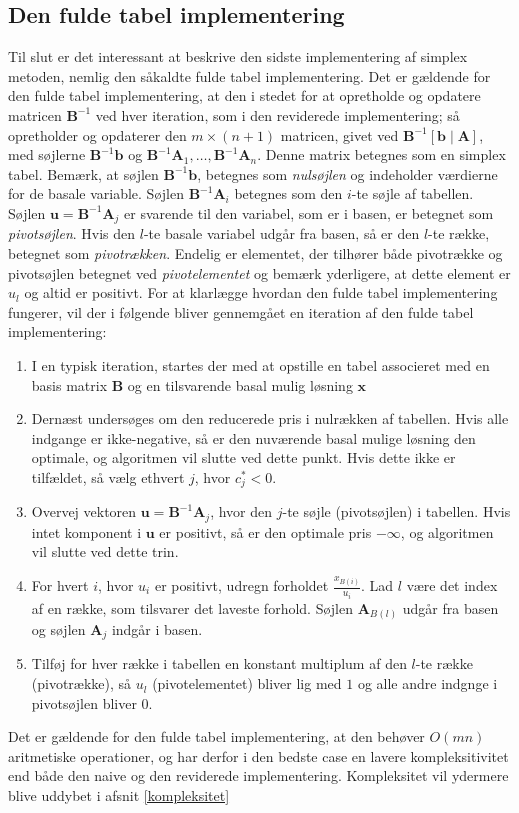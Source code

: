 \subsection{Den fulde tabel implementering}
Til slut er det interessant at beskrive den sidste implementering af simplex metoden, nemlig den såkaldte fulde tabel implementering. Det er gældende for den fulde tabel implementering, at den i stedet for at opretholde og opdatere matricen $\mathbf{B}^{-1}$ ved hver iteration, som i den reviderede implementering; så opretholder og opdaterer den $m \times (n+1)$ matricen, givet ved $\mathbf{B}^{-1} \left [ \mathbf{b} \mid \mathbf{A} \right ]$, med søjlerne $\mathbf{B}^{-1}\mathbf{b}$ og $\mathbf{B}^{-1}\mathbf{A}_1,\ldots,\mathbf{B}^{-1}\mathbf{A}_n$. Denne matrix betegnes som en simplex tabel. Bemærk, at søjlen $\mathbf{B}^{-1}\mathbf{b}$, betegnes som \textit{nulsøjlen} og indeholder værdierne for de basale variable. Søjlen $\mathbf{B}^{-1}\mathbf{A}_i$ betegnes som den $i$-te søjle af tabellen. Søjlen $\mathbf{u} = \mathbf{B}^{-1}\mathbf{A}_j$ er svarende til den variabel, som er i basen, er betegnet som \textit{pivotsøjlen}. Hvis den $l$-te basale variabel udgår fra basen, så er den $l$-te række, betegnet som \textit{pivotrækken}. Endelig er elementet, der tilhører både pivotrække og pivotsøjlen betegnet ved \textit{pivotelementet} og bemærk yderligere, at dette element er $u_l$ og altid er positivt. For at klarlægge hvordan den fulde tabel implementering fungerer, vil der i følgende bliver gennemgået en iteration af den fulde tabel implementering: 
\begin{enumerate}
\item I en typisk iteration, startes der med at opstille en tabel associeret med en basis matrix $\mathbf{B}$ og en tilsvarende basal mulig løsning $\mathbf{x}$
\item Dernæst undersøges om den reducerede pris i nulrækken af tabellen. Hvis alle indgange er ikke-negative, så er den nuværende basal mulige løsning den optimale, og algoritmen vil slutte ved dette punkt. Hvis dette ikke er tilfældet, så vælg ethvert $j$, hvor $c_j^* < 0$.
\item Overvej vektoren $\mathbf{u}=\mathbf{B}^{-1}\mathbf{A}_j$, hvor den $j$-te søjle (pivotsøjlen) i tabellen. Hvis intet komponent i $\mathbf{u}$ er positivt, så er den optimale pris $-\infty$, og algoritmen vil slutte ved dette trin. 
\item For hvert $i$, hvor $u_i$ er positivt, udregn forholdet $\frac{x_{B(i)}}{u_i}$. Lad $l$ være det index  af en række, som tilsvarer det laveste forhold. Søjlen $\mathbf{A}_{B(l)}$ udgår fra basen og søjlen $\mathbf{A}_j$ indgår i basen. 
\item Tilføj for hver række i tabellen en konstant multiplum af den $l$-te række (pivotrække), så $u_l$ (pivotelementet) bliver lig med $1$ og alle andre indgnge i pivotsøjlen bliver 0. 
\end{enumerate}
Det er gældende for den fulde tabel implementering, at den behøver $O(mn)$ aritmetiske operationer, og har derfor i den bedste case en lavere kompleksitivitet end både den naive og den reviderede implementering. Kompleksitet vil ydermere blive uddybet i afsnit \ref{kompleksitet}